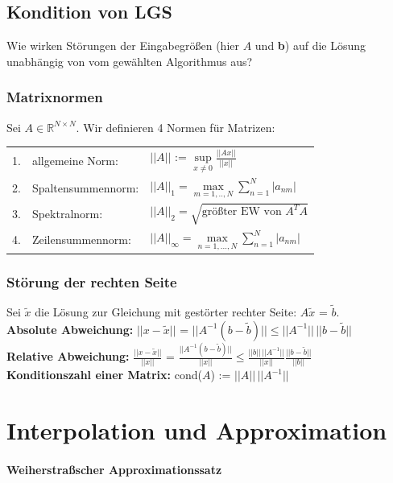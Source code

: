 \documentclass[a4paper, 14pt]{article}
\begin{document}
    \subsection{Kondition von LGS}
    Wie wirken Störungen der Eingabegrößen (hier $A$ und \textbf{b}) auf die Lösung unabhängig von vom gewählten
    Algorithmus aus?

    \subsubsection{Matrixnormen}
    Sei $A\in\mathds{R}^{N\times N}$. Wir definieren 4 Normen für Matrizen:\\
    \newline
    \begin{tabular}[h]{lll}
        1. & allgemeine Norm: & $||A||$ := $\sup\limits_{x\neq 0}\frac{||Ax||}{||x||}$\\
        2. & Spaltensummennorm: & $||A||_1 = \max\limits_{m=1, .., N} \sum\limits_{n=1}^N |a_{nm}|$\\
        3. & Spektralnorm: & $||A||_2 = \sqrt{\text{größter EW von }A^T A}$\\
        4. & Zeilensummennorm: & $||A||_{\infty} = \max\limits_{n=1, ..., N} \sum\limits_{n=1}^N |a_{nm}|$
    \end{tabular}

    \subsubsection{Störung der rechten Seite}
    Sei $\tilde{x}$ die Lösung zur Gleichung mit gestörter rechter Seite: $A\tilde{x}$ = $\tilde{b}$.\\
    \textbf{Absolute Abweichung:} $||x - \tilde{x}||$ = $||A^{-1}(b-\tilde{b})|| \leq ||A^{-1}||\,||b - \tilde{b}||$\\
    \textbf{Relative Abweichung:} $\frac{||x - \tilde{x}||}{||x||}$ = $\frac{||A^{-1}(b-\tilde{b})||}{||x||}
        \leq \frac{||b||\,||A^{-1}||}{||x||}\frac{||b - \tilde{b}||}{||b||}$\\
    \newline
    \textbf{Konditionszahl einer Matrix:} cond($A$) := $||A||\,||A^{-1}||$

	\section{Interpolation und Approximation}

	\paragraph{Weiherstraßscher Approximationssatz}
\end{document}
